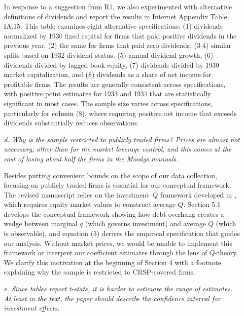 \begin{itemize}
    In response to a suggestion from R1, we also experimented with alternative definitions of dividends and report the results in Internet Appendix Table IA.15. This table examines eight alternative specifications: (1) dividends normalized by 1930 fixed capital for firms that paid positive dividends in the previous year, (2) the same for firms that paid zero dividends, (3-4) similar splits based on 1932 dividend status, (5) annual dividend growth, (6) dividends divided by lagged book equity, (7) dividends divided by 1930 market capitalization, and (8) dividends as a share of net income for profitable firms. The results are generally consistent across specifications, with positive point estimates for 1933 and 1934 that are statistically significant in most cases. The sample size varies across specifications, particularly for column (8), where requiring positive net income that exceeds dividends substantially reduces observations.

    \item[\textit{\textcolor{red!60!black}{d.}}] \textit{\textcolor{red!60!black}{
    Why is the sample restricted to publicly traded firms? Prices are almost not necessary, other than for the market leverage control, and this comes at the cost of losing about half the firms in the Moodys manuals.
    }}

    \bigskip

    \noindent Besides putting convenient bounds on the scope of our data collection, focusing on publicly traded firms is essential for our conceptual framework. The revised manuscript relies on the investment--$Q$ framework developed in \cite{Hennessy2004}, which requires equity market values to construct average $Q$. Section 5.1 develops the conceptual framework showing how debt overhang creates a wedge between marginal $q$ (which governs investment) and average $Q$ (which is observable), and equation (3) derives the empirical specification that guides our analysis. Without market prices, we would be unable to implement this framework or interpret our coefficient estimates through the lens of $Q$-theory. We clarify this motivation at the beginning of Section 4 with a footnote explaining why the sample is restricted to CRSP-covered firms.

    \item[\textit{\textcolor{red!60!black}{e.}}] \textit{\textcolor{red!60!black}{
    Since tables report t-stats, it is harder to estimate the range of estimates. At least in the text, the paper should describe the confidence interval for investment effects.
    }}
       

\end{itemize}
